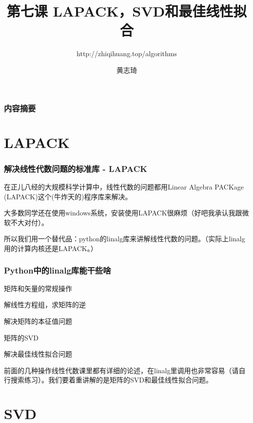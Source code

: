 \documentclass[CJK]{beamer}
\begin{document}
\bch

\title{第七课  LAPACK，SVD和最佳线性拟合}
\subtitle{http://zhiqihuang.top/algorithms}
  \author{黄志琦}
  \date{}

  \maketitle

  \begin{frame}
    \frametitle{内容摘要}
  \tableofcontents
  \end{frame}

  \section{LAPACK}

  \begin{frame}
    \frametitle{解决线性代数问题的标准库 - LAPACK}
    在正儿八经的大规模科学计算中，线性代数的问题都用{\blue Linear Algebra PACKage (LAPACK)}这个(牛炸天的)程序库来解决。

    \skiplines
    
    大多数同学还在使用windows系统，安装使用LAPACK很麻烦（好吧我承认我跟微软不大对付）。

    \skiplines
    
    所以我们用一个替代品：{\blue python的linalg库}来讲解线性代数的问题。（实际上linalg用的计算内核还是LAPACK。）
  \end{frame}


  \begin{frame}
    \frametitle{Python中的linalg库能干些啥}
    \bitem
  \item{矩阵和矢量的常规操作}
  \item{解线性方程组，求矩阵的逆}
  \item{解决矩阵的本征值问题}
  \item{{\blue 矩阵的SVD}}
  \item{{\blue 解决最佳线性拟合问题}}    
    \eitem

    前面的几种操作线性代数课里都有详细的论述，在linalg里调用也非常容易（请自行搜索练习）。我们要着重讲解的是矩阵的SVD和最佳线性拟合问题。
  \end{frame}
  

  \section{SVD}
\end{document}
